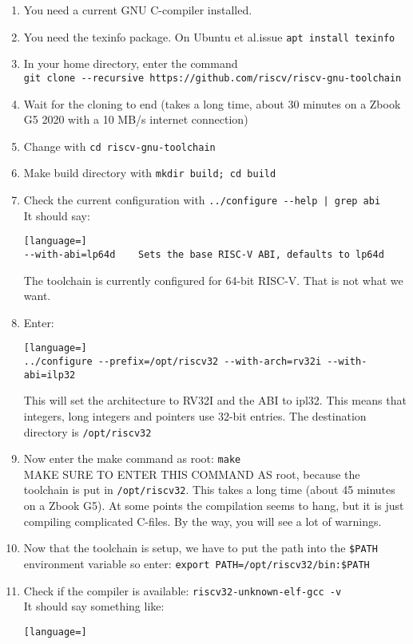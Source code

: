 \documentclass[12pt]{article}
\begin{document}
\begin{enumerate}
\item You need a current GNU C-compiler installed.
\item You need the texinfo package. On Ubuntu et al.\@ issue \lstinline|apt install texinfo|
\item In your home directory, enter the command\\ \lstinline|git clone --recursive https://github.com/riscv/riscv-gnu-toolchain|
\item Wait for the cloning to end (takes a long time, about 30 minutes on a Zbook G5 2020 with a 10 MB/s internet connection)
\item Change with \lstinline|cd riscv-gnu-toolchain|
\item Make build directory with \lstinline|mkdir build; cd build|
\item Check the current configuration with \lstinline!../configure --help | grep abi!\\
      It should say:
\begin{lstlisting}[language=]
--with-abi=lp64d    Sets the base RISC-V ABI, defaults to lp64d
\end{lstlisting}
The toolchain is currently configured for 64-bit RISC-V. That is not what we want.
\item Enter:
\begin{lstlisting}[language=]
../configure --prefix=/opt/riscv32 --with-arch=rv32i --with-abi=ilp32
\end{lstlisting}
This will set the architecture to RV32I and the ABI to ipl32. This means that integers, long integers and pointers use 32-bit entries. The destination directory is \lstinline|/opt/riscv32|
\item Now enter the make command as root: \lstinline|make|\\
MAKE SURE TO ENTER THIS COMMAND AS root, because the toolchain is put in \lstinline|/opt/riscv32|. This takes a long time (about 45 minutes on a Zbook G5). At some points the compilation seems to hang, but it is just compiling complicated C-files. By the way, you will see a lot of warnings.
\item Now that the toolchain is setup, we have to put the path into the \lstinline|$PATH| environment variable so enter: \lstinline|export PATH=/opt/riscv32/bin:$PATH|
\item Check if the compiler is available: \lstinline|riscv32-unknown-elf-gcc -v|\\
It should say something like:
\begin{lstlisting}[language=]

\end{lstlisting}
\end{enumerate}
\end{document}

